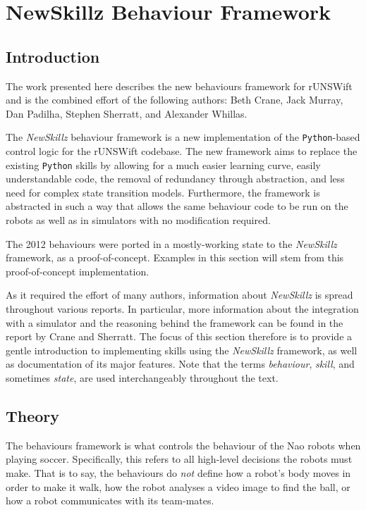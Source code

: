 \chapter{NewSkillz Behaviour Framework}
\label{chap:rl}

\section{Introduction}
The work presented here describes the new behaviours framework for rUNSWift and is the combined effort of the following authors: Beth Crane, Jack Murray, Dan Padilha, Stephen Sherratt, and Alexander Whillas.

The \textit{NewSkillz} behaviour framework is a new implementation of the \verb!Python!-based control logic for the rUNSWift codebase. The new framework aims to replace the existing \verb!Python! skills by allowing for a much easier learning curve, easily understandable code, the removal of redundancy through abstraction, and less need for complex state transition models. Furthermore, the framework is abstracted in such a way that allows the same behaviour code to be run on the robots as well as in simulators with no modification required.

The 2012 behaviours were ported in a mostly-working state to the \textit{NewSkillz} framework, as a proof-of-concept. Examples in this section will stem from this proof-of-concept implementation.

As it required the effort of many authors, information about \textit{NewSkillz} is spread throughout various reports. In particular, more information about the integration with a simulator and the reasoning behind the framework can be found in the report by Crane and Sherratt.\cite{simulator} The focus of this section therefore is to provide a gentle introduction to implementing skills using the \textit{NewSkillz} framework, as well as documentation of its major features. Note that the terms \textit{behaviour}, \textit{skill}, and sometimes \textit{state}, are used interchangeably throughout the text.

\section{Theory}

The behaviours framework is what controls the behaviour of the Nao robots when playing soccer. Specifically, this refers to all high-level decisions the robots must make. That is to say, the behaviours do \textit{not} define how a robot's body moves in order to make it walk, how the robot analyses a video image to find the ball, or how a robot communicates with its team-mates.


